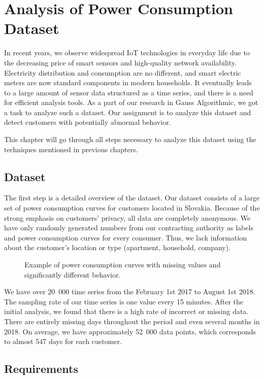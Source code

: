 \chapter{Analysis of Power Consumption Dataset}

In recent years, we observe widespread IoT technologies in everyday life due to the decreasing price of smart sensors and high-quality network availability. Electricity distribution and consumption are no different, and smart electric meters are now standard components in modern households. It eventually leads to a large amount of sensor data structured as a time series, and there is a need for efficient analysis tools. As a part of our research in Gauss Algorithmic, we got a task to analyze such a dataset. Our assignment is to analyze this dataset and detect customers with potentially abnormal behavior.

This chapter will go through all steps necessary to analyze this dataset using the techniques mentioned in previous chapters.

\section{Dataset}
The first step is a detailed overview of the dataset. Our dataset consists of a large set of power consumption curves for customers located in Slovakia. Because of the strong emphasis on customers' privacy, all data are completely anonymous. We have only randomly generated numbers from our contracting authority as labels and power consumption curves for every consumer. Thus, we lack information about the customer's location or type (apartment, household, company).
\begin{figure}[htp]
    \centering
    
    \caption{Example of power consumption curves with missing values and significantly different behavior.}
    \label{fig:dataset-example}
\end{figure}
We have over 20~000 time series from the February 1st 2017 to August 1st 2018. The sampling rate of our time series is one value every 15 minutes. After the initial analysis, we found that there is a high rate of incorrect or missing data. There are entirely missing days throughout the period and even several months in 2018. On average, we have approximately 52~000 data points, which corresponds to almost 547 days for each customer.

\section{Requirements}

